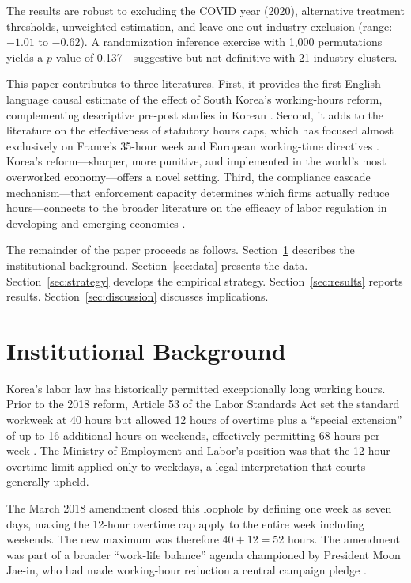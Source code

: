 \documentclass[12pt]{article}
\begin{document}
The results are robust to excluding the COVID year (2020), alternative treatment thresholds, unweighted estimation, and leave-one-out industry exclusion (range: $-1.01$ to $-0.62$). A randomization inference exercise with 1,000 permutations yields a $p$-value of 0.137---suggestive but not definitive with 21 industry clusters.

This paper contributes to three literatures. First, it provides the first English-language causal estimate of the effect of South Korea's working-hours reform, complementing descriptive pre-post studies in Korean \citep{ahn2020}. Second, it adds to the literature on the effectiveness of statutory hours caps, which has focused almost exclusively on France's 35-hour week \citep{crepon2002, hunt1999} and European working-time directives \citep{battisti2017}. Korea's reform---sharper, more punitive, and implemented in the world's most overworked economy---offers a novel setting. Third, the compliance cascade mechanism---that enforcement capacity determines which firms actually reduce hours---connects to the broader literature on the efficacy of labor regulation in developing and emerging economies \citep{lee2021, hamermesh2014}.

The remainder of the paper proceeds as follows. Section~\ref{sec:background} describes the institutional background. Section~\ref{sec:data} presents the data. Section~\ref{sec:strategy} develops the empirical strategy. Section~\ref{sec:results} reports results. Section~\ref{sec:discussion} discusses implications.

\section{Institutional Background}
\label{sec:background}

Korea's labor law has historically permitted exceptionally long working hours. Prior to the 2018 reform, Article 53 of the Labor Standards Act set the standard workweek at 40 hours but allowed 12 hours of overtime plus a ``special extension'' of up to 16 additional hours on weekends, effectively permitting 68 hours per week \citep{yi2023}. The Ministry of Employment and Labor's position was that the 12-hour overtime limit applied only to weekdays, a legal interpretation that courts generally upheld.

The March 2018 amendment closed this loophole by defining one week as seven days, making the 12-hour overtime cap apply to the entire week including weekends. The new maximum was therefore $40 + 12 = 52$ hours. The amendment was part of a broader ``work-life balance'' agenda championed by President Moon Jae-in, who had made working-hour reduction a central campaign pledge \citep{lee2018}.
\end{document}
